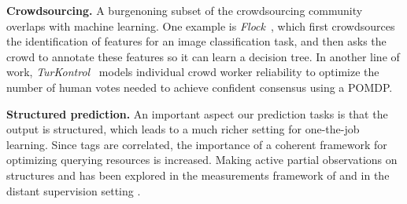 \textbf{Crowdsourcing.}
A burgenoning subset of the crowdsourcing community overlaps with
machine learning. %
One example is \textit{Flock}~\citet{cheng2015flock}, which first crowdsources the identification of
features for an image classification task, and then asks the crowd to annotate
these features so it can learn a decision tree.
In another line of work, \textit{TurKontrol}~\citet{dai2010decision} models
individual crowd worker reliability to optimize the number of human votes
needed to achieve confident consensus using a POMDP\@.

\textbf{Structured prediction.}
An important aspect our prediction tasks is that the output is structured,
which leads to a much richer setting for one-the-job learning.
Since tags are correlated, the importance of a coherent framework for optimizing
querying resources is increased.
Making active partial observations on structures
and has been explored in the measurements framework of \citet{liang09measurements}
and in the distant supervision setting \citet{angeli2014combining}.




